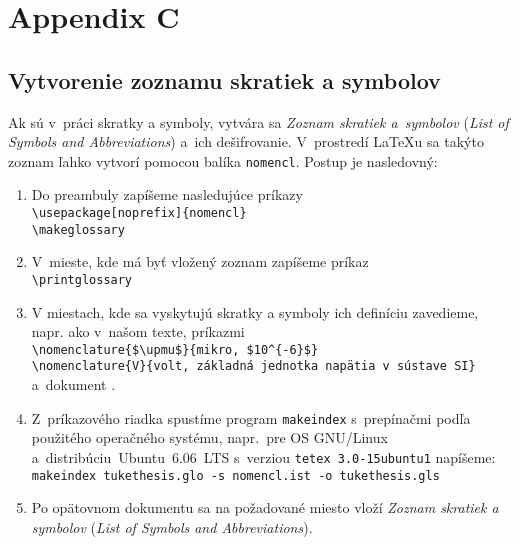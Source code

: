 \section*{Appendix C}
\subsection*{Vytvorenie zoznamu skratiek a symbolov}

Ak sú v~práci skratky a symboly, vytvára sa {\it Zoznam skratiek
a~symbolov} ({\it List of Symbols and Abbreviations}) a~ich
dešifrovanie. V~prostredí \LaTeX{}u sa takýto zoznam ľahko vytvorí
pomocou balíka \verb+nomencl+. Postup je nasledovný:
\begin{enumerate}
\item Do preambuly zapíšeme nasledujúce príkazy\\
\verb+\usepackage[noprefix]{nomencl}+\\ \verb+\makeglossary+
\item  V~mieste, kde má byť\/ vložený zoznam zapíšeme príkaz\\
\verb+\printglossary+
\item V miestach, kde sa vyskytujú skratky a symboly ich definíciu
zavedieme, napr. ako v~našom texte, príkazmi\\
\verb+\nomenclature{$\upmu$}{mikro, $10^{-6}$}+\\
\verb+\nomenclature{V}{volt, základná jednotka napätia v sústave SI}+\\
a~dokument .
\item Z~príkazového riadka spustíme program \verb+makeindex+
s~prepínačmi podľa použitého operačného systému, napr.~pre OS GNU/Linux
a~distribúciu~Ubuntu~$6.06$~LTS s~verziou \verb+tetex 3.0-15ubuntu1+
napíšeme:\\
\verb*+makeindex tukethesis.glo -s nomencl.ist -o tukethesis.gls+
\item Po opätovnom  dokumentu sa na
požadované miesto vloží {\it Zoznam skratiek a symbolov} ({\it List
of Symbols and Abbreviations}).
\end{enumerate}
